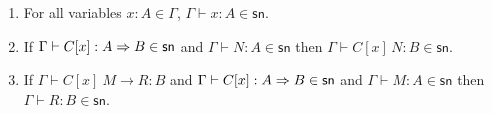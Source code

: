 \documentclass{article}
\newcommand{\csn}{\mathsf{sn}}
\newcommand{\red}{\longrightarrow}
\newcommand{\redsn}{\longrightarrow_\csn}
\begin{document}
\begin{lemma}\label{lm:closn}$\;$
  \begin{enumerate}
  \item\label{cp2} For all variables $x:A \in \Gamma$, $\Gamma \vdash x : A \in \csn$.
  \item\label{cp3} If $\Gamma \vdash C[x] : A \arrow B \in \csn$ and $\Gamma \vdash N : A \in \csn$
     then $\Gamma \vdash C[x]\,N : B \in \csn$.
  \item\label{cp3b} If $\Gamma \vdash C[x]~M \red R : B$ and $\Gamma \vdash C[x] : A \arrow B \in
\csn$ and $\Gamma \vdash M : A \in \csn$ then $\Gamma \vdash R : B\in \csn$.
\end{enumerate}
\end{lemma}
\end{document}

